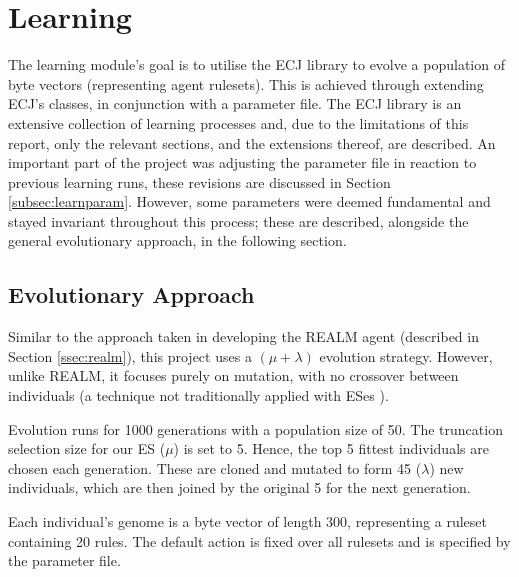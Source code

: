 
\section{Learning}

The learning module's goal is to utilise the ECJ library to evolve a population of byte vectors (representing agent rulesets). This is achieved through extending ECJ's classes, in conjunction with a parameter file. The ECJ library is an extensive collection of learning processes and, due to the limitations of this report, only the relevant sections, and the extensions thereof, are described. An important part of the project was adjusting the parameter file in reaction to previous learning runs, these revisions are discussed in Section \ref{subsec:learnparam}. However, some parameters were deemed fundamental and stayed invariant throughout this process; these are described, alongside the general evolutionary approach, in the following section.


\subsection{Evolutionary Approach}
\label{subsec:learndes}

Similar to the approach taken in developing the REALM agent (described in Section \ref{ssec:realm}), this project uses a  $(\mu  + \lambda)$ evolution strategy. However, unlike REALM, it focuses purely on mutation, with no crossover between individuals (a technique not traditionally applied with ESes \cite[p.~]{ecj-tut3}).

Evolution runs for 1000 generations with a population size of 50. The truncation selection size for our ES ($\mu$) is set to 5. Hence, the top 5 fittest individuals are chosen each generation. These are cloned and mutated to form 45 ($\lambda$) new individuals, which are then joined by the original 5 for the next generation.

Each individual's genome is a byte vector of length 300, representing a ruleset containing 20 rules. The default action is fixed over all rulesets and is specified by the parameter file.

